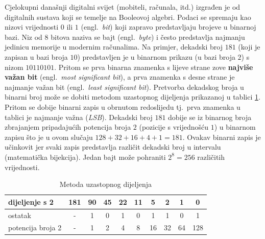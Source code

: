 \documentclass[times, utf8, diplomski]{fer}
\begin{document}
Cjelokupni današnji digitalni svijet (mobiteli, računala, itd.) izgrađen je od digitalnih sustava koji se temelje na Booleovoj algebri. Podaci se spremaju kao nizovi vrijednosti $0$ ili $1$ (engl.~\textit{bit}) koji zapravo predstavljaju brojeve u binarnoj bazi. Niz od $8$ bitova naziva se bajt (engl.~\textit{byte}) i često predstavlja najmanju jedinicu memorije u modernim računalima. Na primjer, dekadski broj $181$ (koji je zapisan u bazi broja $10$) predstavljen je u binarnom prikazu (u bazi broja $2$) s nizom $10110101$. Pritom se prva binarna znamenka s lijeve strane zove \textbf{najviše važan bit} (engl.~\textit{most significant bit}), a prva znamenka s desne strane je najmanje važan bit (engl.~\textit{least significant bit}). Pretvorba dekadskog broja u binarni broj može se dobiti metodom uzastopnog dijeljenja prikazanoj u tablici \ref{tab:pretvorba}. Pritom se dobije binarni zapis u obrnutom redoslijedu tj.~prva znamenka u tablici je najmanje važna (\textit{LSB}). Dekadski broj $181$ dobije se iz binarnog broja zbrajanjem pripadajućih potencija broja $2$ (pozicije s vrijednošću $1$) u binarnom zapisu što je u ovom slučaju $128+32+16+4+1=181$. Ovakav binarni zapis je učinkovit jer svaki zapis predstavlja različit dekadski broj u intervalu (matematička bijekcija). Jedan bajt može pohraniti $2^{8}=256$ različitih vrijednosti.

\begin{table}[htb]
	\centering
	\caption{Metoda uzastopnog dijeljenja}
	\label{tab:pretvorba}
	\begin{tabular}{|l|c|c|c|c|c|c|c|c|c|}
		\hline
		dijeljenje s 2 		& 181 	& 90 & 45 & 22 & 11 & 5  & 2  & 1  & 0		\\ \hline
		ostatak 			& -		& 1  & 0  & 1  & 0  & 1  & 1  & 0  & 1		\\ \hline
		potencija broja 2 	& -		& 1  & 2  & 4  & 8  & 16 & 32 & 64 & 128	\\ \hline
	\end{tabular}
\end{table}
\end{document}

